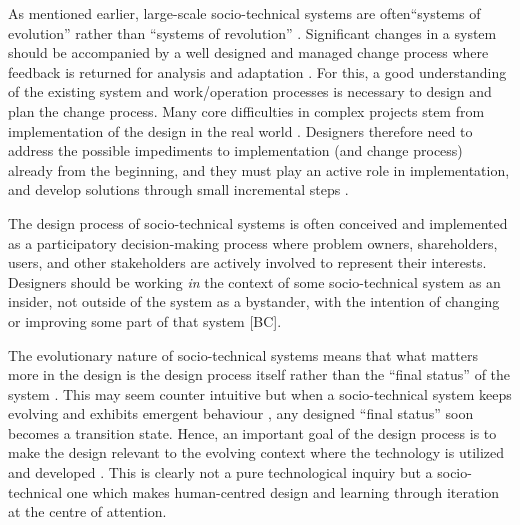 As mentioned earlier, large-scale socio-technical systems are often``systems of evolution'' rather than ``systems of revolution'' \cite{Baxter2011,Norman2015}. Significant changes in a system should be accompanied by a well designed and managed change process where feedback is returned for analysis and adaptation \cite{Baxter2011}. For this, a good understanding of the existing system and work/operation processes is necessary to design and plan the change process. Many core difficulties in complex projects stem from implementation of the design in the real world \cite{Norman2015}. Designers therefore need to address the possible impediments to implementation (and change process) already from the beginning, and they must play an active role in implementation, and develop solutions through small incremental steps \cite{Norman2015}.

 The design process of socio-technical systems is often conceived and implemented as a participatory decision-making process where problem owners, shareholders, users, and other stakeholders are actively involved to represent their interests. 
Designers should be working \textit{in} the context of some socio-technical system as an insider, not outside of the system as a bystander, with the intention of changing or improving some part of that system [BC]. 

The evolutionary nature of socio-technical systems means that what matters more in the design is the design process itself rather than the ``final status'' of the system \cite{Shin2014}. This may seem counter intuitive but when a socio-technical system keeps evolving and exhibits emergent behaviour \cite{Nikolic2009}, any designed ``final status'' soon becomes a transition state. Hence, an important goal of the design process is to make the design relevant to the evolving context where the technology is utilized and developed \cite{Shin2014}. This is clearly not a pure technological inquiry but a socio-technical one which makes human-centred design and learning through iteration at the centre of attention. 


